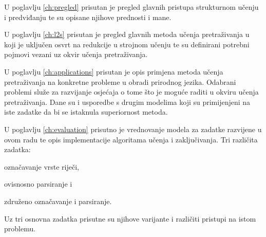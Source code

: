 U poglavlju \ref{ch:pregled} prisutan je pregled glavnih pristupa strukturnom
učenju i predviđanju te su opisane njihove prednosti i mane.

U poglavlju \ref{ch:l2s} prisutan je pregled glavnih metoda učenja pretraživanja
u koji je uključen osvrt na redukcije u strojnom učenju te su definirani
potrebni pojmovi vezani uz okvir učenja pretraživanja.

U poglavlju \ref{ch:applications} prisutan je opis primjena metoda učenja
pretraživanja na konkretne probleme u obradi prirodnog jezika. Odabrani problemi
služe za razvijanje osjećaja o tome što je moguće raditi u okviru učenja
pretraživanja. Dane su i usporedbe s drugim modelima koji su primijenjeni na
iste zadatke da bi se istaknula superiornost \lts{} metoda.

U poglavlju \ref{ch:evaluation} prisutno je vrednovanje modela za zadatke
razvijene u ovom radu te opis implementacije algoritama učenja i zaključivanja.
Tri različita zadatka:
\begin{inlinelist}
  \item označavanje vrste riječi,
  \item ovisnosno parsiranje i
  \item združeno označavanje i parsiranje.
\end{inlinelist}
Uz tri osnovna zadatka prisutne su njihove varijante i različiti pristupi na
istom problemu.
